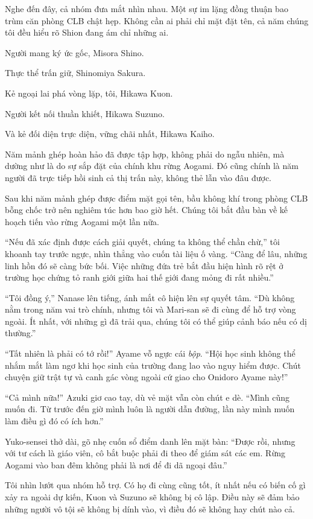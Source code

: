 \documentclass[../main.tex]{subfiles}
\begin{document}
Nghe đến đây, cả nhóm đưa mắt nhìn nhau. Một sự im lặng đồng thuận bao trùm căn phòng CLB chật hẹp. Không cần ai phải chỉ mặt đặt tên, cả năm chúng tôi đều hiểu rõ Shion đang ám chỉ những ai.

Người mang ký ức gốc, Misora Shino.

Thực thể trấn giữ, Shinomiya Sakura.

Kẻ ngoại lai phá vòng lặp, tôi, Hikawa Kuon.

Người kết nối thuần khiết, Hikawa Suzuno.

Và kẻ đối diện trực diện, vững chãi nhất, Hikawa Kaiho.

Năm mảnh ghép hoàn hảo đã được tập hợp, không phải do ngẫu nhiên, mà dường như là do sự sắp đặt của chính khu rừng Aogami. Đó cũng chính là năm người đã trực tiếp hồi sinh cả thị trấn này, không thẻ lẫn vào đâu được.


Sau khi năm mảnh ghép được điểm mặt gọi tên, bầu không khí trong phòng CLB bỗng chốc trở nên nghiêm túc hơn bao giờ hết. Chúng tôi bắt đầu bàn về kế hoạch tiến vào rừng Aogami một lần nữa.

``Nếu đã xác định được cách giải quyết, chúng ta không thể chần chừ,'' tôi khoanh tay trước ngực, nhìn thẳng vào cuốn tài liệu ố vàng. ``Càng để lâu, những linh hồn đó sẽ càng bức bối. Việc những đứa trẻ bắt đầu hiện hình rõ rệt ở trường học chứng tỏ ranh giới giữa hai thế giới đang mỏng đi rất nhiều.''

``Tôi đồng ý,'' Nanase lên tiếng, ánh mắt cô hiện lên sự quyết tâm. ``Dù không nằm trong năm vai trò chính, nhưng tôi và Mari-san sẽ đi cùng để hỗ trợ vòng ngoài. Ít nhất, với những gì đã trải qua, chúng tôi có thể giúp cảnh báo nếu có dị thường.''

``Tất nhiên là phải có tớ rồi!'' Ayame vỗ ngực cái \textit{bộp}. ``Hội học sinh không thể nhắm mắt làm ngơ khi học sinh của trường đang lao vào nguy hiểm được. Chút chuyện giữ trật tự và canh gác vòng ngoài cứ giao cho Onidoro Ayame này!''

``Cả mình nữa!'' Azuki giơ cao tay, dù vẻ mặt vẫn còn chút e dè. ``Mình cũng muốn đi. Từ trước đến giờ mình luôn là người dẫn đường, lần này mình muốn làm điều gì đó có ích hơn.''

Yuko-sensei thở dài, gõ nhẹ cuốn sổ điểm danh lên mặt bàn: ``Được rồi, nhưng với tư cách là giáo viên, cô bắt buộc phải đi theo để giám sát các em. Rừng Aogami vào ban đêm không phải là nơi để đi dã ngoại đâu.''

Tôi nhìn lướt qua nhóm hỗ trợ. Có họ đi cùng cũng tốt, ít nhất nếu có biến cố gì xảy ra ngoài dự kiến, Kuon và Suzuno sẽ không bị cô lập. Điều này sẽ đảm bảo những người vô tội sẽ không bị dính vào, vì điều đó sẽ không hay chút nào cả.
\end{document}
